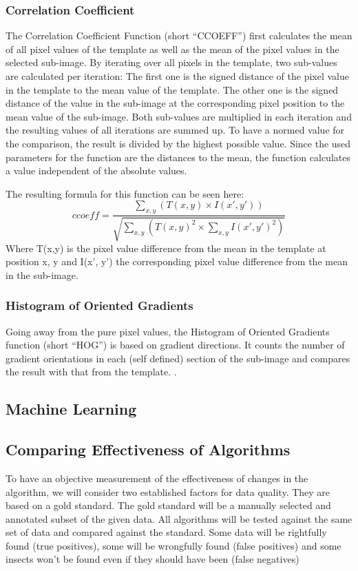 \subsubsection{Correlation Coefficient}
The Correlation Coefficient Function (short ``CCOEFF'') first calculates the mean of all pixel values of the template as well as the mean of the pixel values in the selected sub-image.
By iterating over all pixels in the template, two sub-values are calculated per iteration:
The first one is the signed distance of the pixel value in the template to the mean value of the template.
The other one is the signed distance of the value in the sub-image at the corresponding pixel position to the mean value of the sub-image.
Both sub-values are multiplied in each iteration and the resulting values of all iterations are summed up.
To have a normed value for the comparison, the result is divided by the highest possible value.
Since the used parameters for the function are the distances to the mean, the function calculates a value independent of the absolute values.

The resulting formula for this function can be seen here:
\[ccoeff = \frac{\sum_{x,y} (T(x,y) \times I(x',y'))}{\sqrt{\sum_{x,y} (T(x,y)^2 \times \sum_{x,y} I(x',y')^2)}} \]
Where T(x,y) is the pixel value difference from the mean in the template at position x, y and I(x', y') the corresponding pixel value difference from the mean in the sub-image.

\subsubsection{Histogram of Oriented Gradients}
Going away from the pure pixel values, the Histogram of Oriented Gradients function (short ``HOG'') is based on gradient directions.
It counts the number of gradient orientations in each (self defined) section of the sub-image and compares the result with that from the template.
\cite{hog_function}.

\subsection{Machine Learning}

\subsection{Comparing Effectiveness of Algorithms}
To have an objective measurement of the effectiveness of changes in the algorithm, we will consider two established factors for data quality. 
They are based on a gold standard. 
The gold standard will be a manually selected and annotated subset of the given data. 
All algorithms will be tested against the same set of data and compared against the standard.
Some data will be rightfully found (true positives), some will be wrongfully found (false positives) and some insects won't be found even if they should have been (false negatives)

